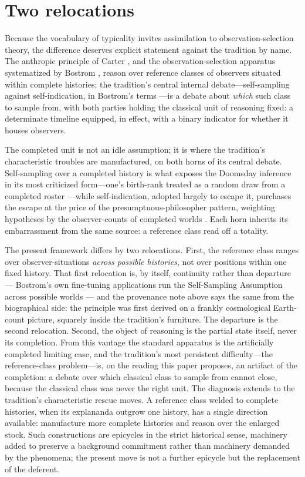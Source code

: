\section{Two relocations}
\label{sec:relocations}

Because the vocabulary of typicality invites assimilation to observation-selection theory, the difference deserves explicit statement against the tradition by name. The anthropic principle of Carter \cite{carter1974large}, and the observation-selection apparatus systematized by Bostrom \cite{bostrom2002anthropic}, reason over reference classes of observers situated within complete histories; the tradition's central internal debate---self-sampling against self-indication, in Bostrom's terms \cite{bostrom2002anthropic}---is a debate about \emph{which} such class to sample from, with both parties holding the classical unit of reasoning fixed: a determinate timeline equipped, in effect, with a binary indicator for whether it houses observers.

The completed unit is not an idle assumption; it is where the tradition's characteristic troubles are manufactured, on both horns of its central debate. Self-sampling over a completed history is what exposes the Doomsday inference in its most criticized form---one's birth-rank treated as a random draw from a completed roster \cite{leslie1996end, bostrom2002anthropic}---while self-indication, adopted largely to escape it, purchases the escape at the price of the presumptuous-philosopher pattern, weighting hypotheses by the observer-counts of completed worlds \cite{bostrom2002anthropic}. Each horn inherits its embarrassment from the same source: a reference class read off a totality.

The present framework differs by two relocations. First, the reference class ranges over observer-situations \emph{across possible histories}, not over positions within one fixed history. That first relocation is, by itself, continuity rather than departure --- Bostrom's own fine-tuning applications run the Self-Sampling Assumption across possible worlds \cite{bostrom2002anthropic} --- and the provenance note above says the same from the biographical side: the principle was first derived on a frankly cosmological Earth-count picture, squarely inside the tradition's furniture. The departure is the second relocation. Second, the object of reasoning is the partial state itself, never its completion. From this vantage the standard apparatus is the artificially completed limiting case, and the tradition's most persistent difficulty---the reference-class problem---is, on the reading this paper proposes, an artifact of the completion: a debate over which classical class to sample from cannot close, because the classical class was never the right unit. The diagnosis extends to the tradition's characteristic rescue moves. A reference class welded to complete histories, when its explananda outgrow one history, has a single direction available: manufacture more complete histories and reason over the enlarged stock. Such constructions are epicycles in the strict historical sense, machinery added to preserve a background commitment rather than machinery demanded by the phenomena; the present move is not a further epicycle but the replacement of the deferent.

